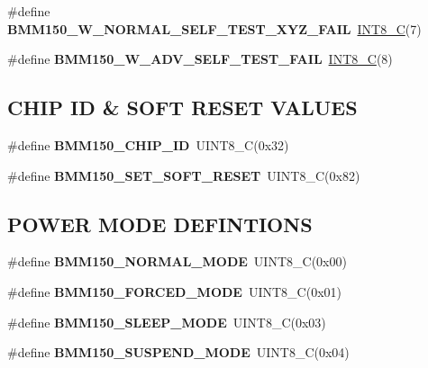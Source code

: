 \begin{DoxyCompactItemize}
\item 
\mbox{\label{group___b_m_m150_ga2f7e1d70f3762cc2f0c15c88f3c54b0f}} 
\#define {\bfseries B\+M\+M150\+\_\+\+W\+\_\+\+N\+O\+R\+M\+A\+L\+\_\+\+S\+E\+L\+F\+\_\+\+T\+E\+S\+T\+\_\+\+X\+Y\+Z\+\_\+\+F\+A\+IL}~\hyperlink{group___b_m_m150_ga1eaa7db37089dcdfb60227725c9c1585}{I\+N\+T8\+\_\+C}(7)
\item 
\mbox{\label{group___b_m_m150_gadfdfb6f13d803880acf88a0c4d5a933a}} 
\#define {\bfseries B\+M\+M150\+\_\+\+W\+\_\+\+A\+D\+V\+\_\+\+S\+E\+L\+F\+\_\+\+T\+E\+S\+T\+\_\+\+F\+A\+IL}~\hyperlink{group___b_m_m150_ga1eaa7db37089dcdfb60227725c9c1585}{I\+N\+T8\+\_\+C}(8)
\end{DoxyCompactItemize}
\subsection*{C\+H\+IP ID \& S\+O\+FT R\+E\+S\+ET V\+A\+L\+U\+ES}
\begin{DoxyCompactItemize}
\item 
\mbox{\label{group___b_m_m150_ga4f3e92e863e3bc56eb68e7fd7edad30f}} 
\#define {\bfseries B\+M\+M150\+\_\+\+C\+H\+I\+P\+\_\+\+ID}~U\+I\+N\+T8\+\_\+C(0x32)
\item 
\mbox{\label{group___b_m_m150_gad4e1a7316da5f4ef680fc284dbb97f1d}} 
\#define {\bfseries B\+M\+M150\+\_\+\+S\+E\+T\+\_\+\+S\+O\+F\+T\+\_\+\+R\+E\+S\+ET}~U\+I\+N\+T8\+\_\+C(0x82)
\end{DoxyCompactItemize}
\subsection*{P\+O\+W\+ER M\+O\+DE D\+E\+F\+I\+N\+T\+I\+O\+NS}
\begin{DoxyCompactItemize}
\item 
\mbox{\label{group___b_m_m150_ga59038d30adf852a9189271be212916d0}} 
\#define {\bfseries B\+M\+M150\+\_\+\+N\+O\+R\+M\+A\+L\+\_\+\+M\+O\+DE}~U\+I\+N\+T8\+\_\+C(0x00)
\item 
\mbox{\label{group___b_m_m150_gaf473dd93df57b0a43966fbb08c58f3fd}} 
\#define {\bfseries B\+M\+M150\+\_\+\+F\+O\+R\+C\+E\+D\+\_\+\+M\+O\+DE}~U\+I\+N\+T8\+\_\+C(0x01)
\item 
\mbox{\label{group___b_m_m150_gaaa3f3198d96e944305377175fd55da1a}} 
\#define {\bfseries B\+M\+M150\+\_\+\+S\+L\+E\+E\+P\+\_\+\+M\+O\+DE}~U\+I\+N\+T8\+\_\+C(0x03)
\item 
\mbox{\label{group___b_m_m150_ga367ff57502c166a70c7c2dc72a5dcc43}} 
\#define {\bfseries B\+M\+M150\+\_\+\+S\+U\+S\+P\+E\+N\+D\+\_\+\+M\+O\+DE}~U\+I\+N\+T8\+\_\+C(0x04)
\end{DoxyCompactItemize}
